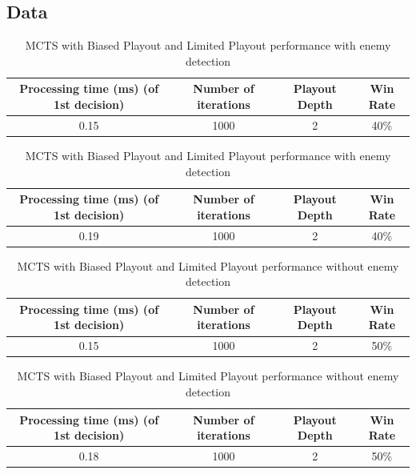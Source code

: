 \documentclass{article}
\begin{document}
  \subsection{Data}
  \begin{table}[h!]
    \centering
    \caption{MCTS with Biased Playout and Limited Playout performance with enemy detection}
    \label{tab:tableLimitedBiasedMCTS1}
    \begin{tabular}{c|c|c|c}
      \textbf{Processing time (ms) (of 1st decision)} & \textbf{Number of iterations} & \textbf{Playout Depth} & \textbf{Win Rate}\\
      \hline
      0.15 & 1000 & 2 & 40\%
    \end{tabular}
  \end{table}
  \begin{table}[h!]
    \centering
    \caption{MCTS with Biased Playout and Limited Playout performance with enemy detection}
    \label{tab:tableLimitedBiasedMCTS2}
    \begin{tabular}{c|c|c|c}
      \textbf{Processing time (ms) (of 1st decision)} & \textbf{Number of iterations} & \textbf{Playout Depth} & \textbf{Win Rate}\\
      \hline
      0.19 & 1000 & 2 & 40\%
    \end{tabular}
  \end{table}
  \begin{table}[h!]
    \centering
    \caption{MCTS with Biased Playout and Limited Playout performance without enemy detection}
    \label{tab:tableLimitedBiasedMCTS3}
    \begin{tabular}{c|c|c|c}
      \textbf{Processing time (ms) (of 1st decision)} & \textbf{Number of iterations} & \textbf{Playout Depth} & \textbf{Win Rate}\\
      \hline
      0.15 & 1000 & 2 & 50\%
    \end{tabular}
  \end{table}
  \begin{table}[h!]
    \centering
    \caption{MCTS with Biased Playout and Limited Playout performance without enemy detection}
    \label{tab:tableLimitedBiasedMCTS4}
    \begin{tabular}{c|c|c|c}
      \textbf{Processing time (ms) (of 1st decision)} & \textbf{Number of iterations} & \textbf{Playout Depth} & \textbf{Win Rate}\\
      \hline
      0.18 & 1000 & 2 & 50\%
    \end{tabular}
  \end{table}
\end{document}
